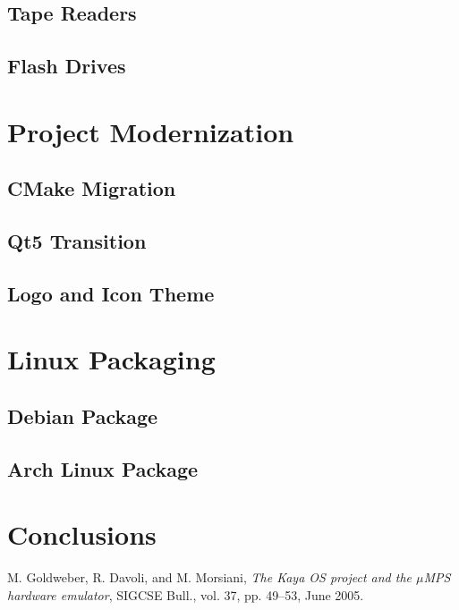 \documentclass[12pt,a4paper,openright,twoside]{report}
\begin{document}
\section{Tape Readers}
\section{Flash Drives}
\chapter{Project Modernization}
\lhead[\fancyplain{}{\bfseries\thepage}]{\fancyplain{}{\bfseries\rightmark}}
\section{CMake Migration}
\section{Qt5 Transition}
\section{Logo and Icon Theme}
\chapter{Linux Packaging}
\lhead[\fancyplain{}{\bfseries\thepage}]{\fancyplain{}{\bfseries\rightmark}}
\section{Debian Package}
\section{Arch Linux Package}
\chapter{Conclusions}
\lhead[\fancyplain{}{\bfseries\thepage}]{\fancyplain{}{\bfseries\rightmark}}
\begin{thebibliography}{99}
  M. Goldweber, R. Davoli, and M. Morsiani,
  \textit{The Kaya OS project and the $\mu$MPS hardware emulator},
   SIGCSE Bull.,
   vol. 37, pp. 49–53,
   June 2005.
\end{thebibliography}
\end{document}
